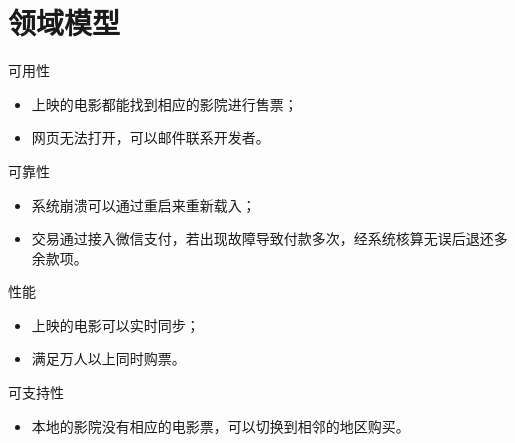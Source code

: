 \documentclass[a4paper]{article}
\begin{document}
  \section{领域模型}
  \par {\heiti 可用性}
  \begin{itemize}
    \item 上映的电影都能找到相应的影院进行售票；
    \item 网页无法打开，可以邮件联系开发者。
  \end{itemize}
  \par {\heiti 可靠性}
  \begin{itemize}
    \item 系统崩溃可以通过重启来重新载入；
    \item 交易通过接入微信支付，若出现故障导致付款多次，经系统核算无误后退还多余款项。
  \end{itemize}
  \par {\heiti 性能}
  \begin{itemize}
    \item 上映的电影可以实时同步；
    \item 满足万人以上同时购票。
  \end{itemize}
    \par {\heiti 可支持性}
  \begin{itemize}
    \item 本地的影院没有相应的电影票，可以切换到相邻的地区购买。
  \end{itemize}
\end{document}
